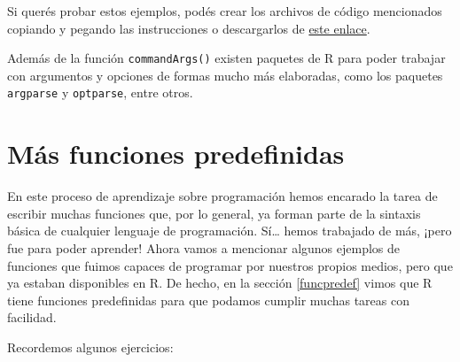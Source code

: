 \documentclass[
]{book}
\begin{document}
Si querés probar estos ejemplos, podés crear los archivos de código mencionados copiando y pegando las instrucciones o descargarlos de \href{https://github.com/mpru/introprog/tree/master/archivos}{este enlace}.

Además de la función \texttt{commandArgs()} existen paquetes de R para poder trabajar con argumentos y opciones de formas mucho más elaboradas, como los paquetes \texttt{argparse} y \texttt{optparse}, entre otros.

\hypertarget{muxe1s-funciones-predefinidas}{%
\section{Más funciones predefinidas}\label{muxe1s-funciones-predefinidas}}

En este proceso de aprendizaje sobre programación hemos encarado la tarea de escribir muchas funciones que, por lo general, ya forman parte de la sintaxis básica de cualquier lenguaje de programación. Sí\ldots{} hemos trabajado de más, ¡pero fue para poder aprender! Ahora vamos a mencionar algunos ejemplos de funciones que fuimos capaces de programar por nuestros propios medios, pero que ya estaban disponibles en R. De hecho, en la sección \ref{funcpredef} vimos que R tiene funciones predefinidas para que podamos cumplir muchas tareas con facilidad.

Recordemos algunos ejercicios:
\end{document}
